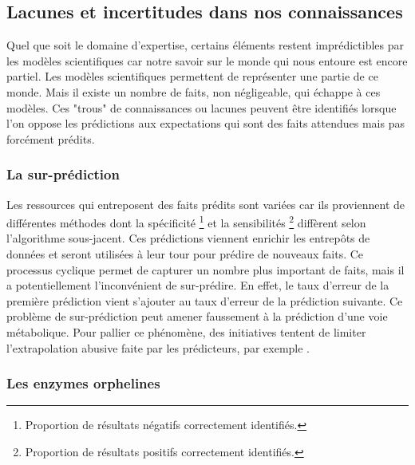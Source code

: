 \begin{refsegment}
    \subsection{Lacunes et incertitudes dans nos connaissances}\label{subsec:lacunes}
    
    Quel que soit le domaine d’expertise, certains éléments restent imprédictibles par les modèles scientifiques car notre savoir sur le monde qui nous entoure est encore partiel. Les modèles scientifiques permettent de représenter une partie de ce monde. Mais il existe un nombre de faits, non négligeable, qui échappe à ces  modèles. Ces "trous" de connaissances ou lacunes peuvent être identifiés lorsque l’on oppose les prédictions aux expectations qui sont des faits attendues mais pas forcément prédits.
    
    \subsubsection{La sur-prédiction}
    
    Les ressources qui entreposent des faits prédits sont variées car ils proviennent de différentes méthodes dont la spécificité \footnote{Proportion de résultats négatifs correctement identifiés.} et la sensibilités \footnote{Proportion de résultats positifs correctement identifiés.} diffèrent selon l’algorithme sous-jacent. Ces prédictions viennent enrichir les entrepôts de données et seront utilisées à leur tour pour prédire de nouveaux faits. Ce processus cyclique permet de capturer un nombre plus important de faits, mais il a potentiellement l’inconvénient de sur-prédire. En effet, le taux d’erreur de la première prédiction vient s’ajouter au taux d’erreur de la prédiction suivante. Ce problème de sur-prédiction peut amener faussement à la prédiction d'une voie métabolique. Pour pallier ce phénomène, des initiatives tentent de limiter l’extrapolation abusive faite par les prédicteurs, par exemple \citeauthor{pfeiffer2015manual}.
    
    
    \subsubsection{Les enzymes orphelines}
    

\end{refsegment}
